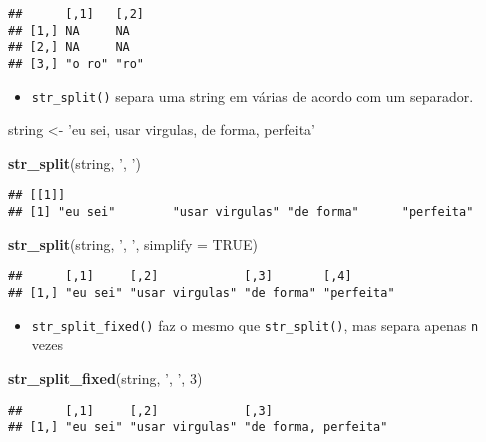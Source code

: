 \documentclass[]{book}
\newenvironment{Shaded}{\begin{snugshade}}{\end{snugshade}}
\newcommand{\KeywordTok}[1]{\textcolor[rgb]{0.13,0.29,0.53}{\textbf{{#1}}}}
\newcommand{\DataTypeTok}[1]{\textcolor[rgb]{0.13,0.29,0.53}{{#1}}}
\newcommand{\DecValTok}[1]{\textcolor[rgb]{0.00,0.00,0.81}{{#1}}}
\newcommand{\StringTok}[1]{\textcolor[rgb]{0.31,0.60,0.02}{{#1}}}
\newcommand{\OtherTok}[1]{\textcolor[rgb]{0.56,0.35,0.01}{{#1}}}
\newcommand{\NormalTok}[1]{{#1}}
\providecommand{\tightlist}{%
  \setlength{\itemsep}{0pt}\setlength{\parskip}{0pt}}
\begin{document}
\begin{verbatim}
##      [,1]   [,2]
## [1,] NA     NA  
## [2,] NA     NA  
## [3,] "o ro" "ro"
\end{verbatim}

\begin{itemize}
\tightlist
\item
  \texttt{str\_split()} separa uma string em várias de acordo com um
  separador.
\end{itemize}

\begin{Shaded}
\begin{Highlighting}[]
\NormalTok{string <-}\StringTok{ 'eu sei, usar virgulas, de forma, perfeita'}

\KeywordTok{str_split}\NormalTok{(string, }\StringTok{', '}\NormalTok{)}
\end{Highlighting}
\end{Shaded}

\begin{verbatim}
## [[1]]
## [1] "eu sei"        "usar virgulas" "de forma"      "perfeita"
\end{verbatim}

\begin{Shaded}
\begin{Highlighting}[]
\KeywordTok{str_split}\NormalTok{(string, }\StringTok{', '}\NormalTok{, }\DataTypeTok{simplify =} \OtherTok{TRUE}\NormalTok{)}
\end{Highlighting}
\end{Shaded}

\begin{verbatim}
##      [,1]     [,2]            [,3]       [,4]      
## [1,] "eu sei" "usar virgulas" "de forma" "perfeita"
\end{verbatim}

\begin{itemize}
\tightlist
\item
  \texttt{str\_split\_fixed()} faz o mesmo que \texttt{str\_split()},
  mas separa apenas \texttt{n} vezes
\end{itemize}

\begin{Shaded}
\begin{Highlighting}[]
\KeywordTok{str_split_fixed}\NormalTok{(string, }\StringTok{', '}\NormalTok{, }\DecValTok{3}\NormalTok{)}
\end{Highlighting}
\end{Shaded}

\begin{verbatim}
##      [,1]     [,2]            [,3]                
## [1,] "eu sei" "usar virgulas" "de forma, perfeita"
\end{verbatim}
\end{document}
